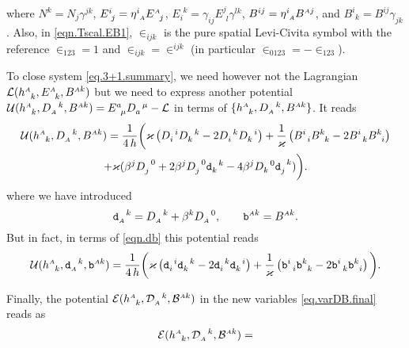 \documentclass[
10pt, %
a4paper, %
oneside, %
headinclude,footinclude, %
BCOR5mm, %
]{scrartcl}
\newcommand{\sA}{\mathsmaller A}
\newcommand{\tetrsymbol}{h}
\newcommand{\itetrsymbol}{\eta}
\newcommand{\itetr}[2]{\itetrsymbol^{#1}_{\phantom{#1}#2}}
\newcommand{\tetr}[2]{\tetrsymbol^{#1}_{\phantom{#1}#2}}
\newcommand{\detTetr}{\tetrsymbol}
\newcommand{\ET}[2]{E^{#1}_{\phantom{#1}#2}}	%
\newcommand{\ETmix}[2]{E^{#1}_{#2}}	%
\newcommand{\dT}[2]{D_{#1}^{\phantom{#1}\,#2}}	%
\newcommand{\ddT}[2]{\mathcal{D}_{#1}^{\phantom{#1}\,#2}}	%
\newcommand{\dddT}[2]{\mathtt{d}_{#1}^{\phantom{#1}\,#2}}	%
\newcommand{\BT}[2]{B^{#1#2}}	%
\newcommand{\BTmix}[2]{B^{#1}_{#2}}	%
\newcommand{\bT}[2]{B^{#1#2}}	%
\newcommand{\bbT}[2]{\mathcal{B}^{#1#2}}	%
\newcommand{\bbbT}[2]{\mathtt{b}^{#1#2}}	%
\newcommand{\bbbTmix}[2]{\mathtt{b}^{#1}_{#2}}	%
\newcommand{\bbTmix}[2]{\mathcal{B}^{#1}_{#2}}
\newcommand{\LagBE}{\mathcal{L}}%
\newcommand{\LagST}{\mathcal{U}}%
\newcommand{\Lagtpo}{\mathcal{E}}%
\newcommand{\LCsymb}{\bm{\in}}    %
\begin{document}
where  $ N^k = N_j \gamma^{jk} $, $ \ET{i}{j} = 
\itetr{i}{\sA} \ET{\sA}{j}$, $ \ETmix{\ \,k}{i} = \gamma_{ij} \ET{j}{l} \gamma^{lk} 
$, $ \BT{i}{j} = \itetr{i}{\sA} 
\BT{\sA}{j} $,  and $ \BTmix{i}{\ \,k} = 
\BT{i}{j} \gamma_{jk}$. Also, in \eqref{eqn.Tscal.EB1}, $ \LCsymb_{ijk} $ is the pure spatial 
Levi-Civita symbol with the reference $ \LCsymb_{123}=1 $ and $ \LCsymb_{ijk} = \LCsymb^{ijk} $ (in 
particular $ \LCsymb_{0123} = -\LCsymb_{123} $).

 
To close system \eqref{eq.3+1.summary}, we need however not the Lagrangian $ 
\LagBE(\tetr{\sA}{k},\ET{\sA}{k},\BT{\sA}{k}) $ but we need to express another 
potential $ \LagST(\tetr{\sA}{k},\dT{\sA}{k},\bT{\sA}{k}) = \ET{a}{\mu} 
\dT{a}{\mu} - \LagBE$
in terms of $ \{\tetr{\sA}{k},\dT{\sA}{k},\bT{\sA}{k}\} $. It reads
\begin{multline}\label{eq.Lagr.DB}
	 \LagST(\tetr{\sA}{k},\dT{\sA}{k},\bT{\sA}{k}) = 
	 \frac{1}{4\,h} \bigg( \varkappa \left(
	 \dT{i}{i}\dT{k}{k} - 2 \dT{i}{k}\dT{k}{i}
	 \right)
 	+ \frac{1}{\varkappa} \left ( 
	 \BTmix{i}{\ \,i}\BTmix{k}{\ \,k}
	 - 2 \BTmix{i}{\ \,k}\BTmix{k}{\ \,i}
	 \right ) \\
	 	+ \varkappa (\beta^j \dT{j}{0} + 2 \beta^j \dT{j}{0}\dddT{k}{k} - 4 \beta^j \dT{k}{0} 
	 	\dddT{j}{k}) 
	 	\bigg).
\end{multline}
where we have introduced
\begin{equation}\label{eqn.db}
	\dddT{\sA}{k} = \dT{\sA}{k} + \beta^k \dT{\sA}{0}, \qquad \bbbT{\sA}{k} = \bT{\sA}{k}.
\end{equation}
But in fact, in terms of \eqref{eqn.db} this potential reads
\begin{equation}\label{eq.Lagr.db}
	\LagST(\tetr{\sA}{k},\dddT{\sA}{k},\bbbT{\sA}{k}) = 
	\frac{1}{4\,h} \bigg( \varkappa \left(
	\dddT{i}{i}\dddT{k}{k} - 2 \dddT{i}{k}\dddT{k}{i}
	\right)
	+ \frac{1}{\varkappa} \left ( 
	\bbbTmix{i}{\ \,i}\bbbTmix{k}{\ \,k}
	- 2 \bbbTmix{i}{\ \,k}\bbbTmix{k}{\ \,i}
	\right ) \bigg).
\end{equation}

Finally, the potential $ \Lagtpo(\tetr{\sA}{k},\ddT{\sA}{k},\bbT{\sA}{k}) $ in 
the new variables \eqref{eq.varDB.final} reads as
\begin{equation}\label{eq.Lagr.DB.final}
	\Lagtpo(\tetr{\sA}{k},\ddT{\sA}{k},\bbT{\sA}{k}) = 
\end{equation}
\end{document}
